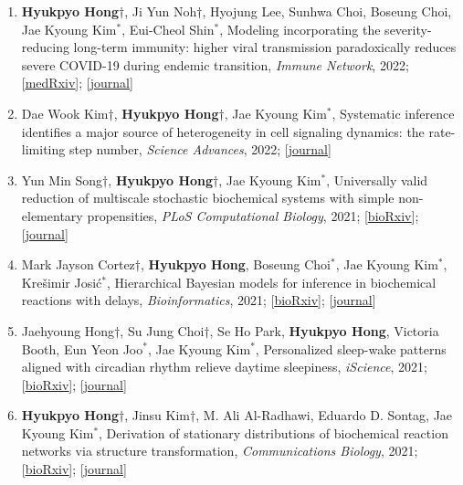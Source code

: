 \documentclass[margin,line]{res}
\begin{document}
\begin{resume}
\begin{enumerate}[leftmargin=*]
    \item \textbf{Hyukpyo Hong}$\dagger$, Ji Yun Noh$\dagger$, Hyojung Lee, Sunhwa Choi, Boseung Choi, Jae Kyoung Kim${}^*$, Eui-Cheol Shin${}^*$, Modeling incorporating the severity-reducing long-term immunity: higher viral transmission paradoxically reduces severe COVID-19 during endemic transition, \textit{Immune Network}, 2022; [\href{https://doi.org/10.1101/2022.02.09.22270633}{\ul{medRxiv}}]; [\href{https://doi.org/10.4110/in.2022.22.e23}{\ul{journal}}]

    \item Dae Wook Kim$\dagger$, \textbf{Hyukpyo Hong}$\dagger$, Jae Kyoung Kim${}^*$, Systematic inference identifies a major source of heterogeneity in cell signaling dynamics: the rate-limiting step number, \textit{Science Advances}, 2022; [\href{https://www.science.org/doi/10.1126/sciadv.abl4598}{\ul{journal}}]

    \item Yun Min Song$\dagger$, \textbf{Hyukpyo Hong}$\dagger$, Jae Kyoung Kim${}^*$, Universally valid reduction of multiscale stochastic biochemical systems with simple non-elementary propensities, \textit{PLoS Computational Biology}, 2021; [\href{https://doi.org/10.1101/2021.04.08.438974}{\ul{bioRxiv}}]; [\href{https://doi.org/10.1371/journal.pcbi.1008952}{\ul{journal}}]

    \item Mark Jayson Cortez$\dagger$, \textbf{Hyukpyo Hong}, Boseung Choi${}^*$, Jae Kyoung Kim${}^*$, Krešimir Josić${}^*$, Hierarchical Bayesian models for inference in biochemical reactions with delays, \textit{Bioinformatics}, 2021; [\href{https://doi.org/10.1101/2021.08.16.456485}{\ul{bioRxiv}}]; [\href{https://doi.org/10.1093/bioinformatics/btab618}{\ul{journal}}]

    \item Jaehyoung Hong$\dagger$, Su Jung Choi$\dagger$, Se Ho Park, \textbf{Hyukpyo Hong}, Victoria Booth, Eun Yeon Joo${}^*$, Jae Kyoung Kim${}^*$, Personalized sleep-wake patterns aligned with circadian rhythm relieve daytime sleepiness, \textit{iScience}, 2021; [\href{https://doi.org/10.1101/2021.03.15.435366}{\ul{bioRxiv}}]; [\href{https://doi.org/10.1016/j.isci.2021.103129}{\ul{journal}}]

    \item \textbf{Hyukpyo Hong}$\dagger$, Jinsu Kim$\dagger$, M. Ali Al-Radhawi, Eduardo D. Sontag, Jae Kyoung Kim${}^*$, Derivation of stationary distributions of biochemical reaction networks via structure transformation, \textit{Communications Biology}, 2021; [\href{https://doi.org/10.1101/2021.03.23.436681}{\ul{bioRxiv}}]; [\href{https://www.nature.com/articles/s42003-021-02117-x}{\ul{journal}}]


\end{enumerate}
\end{resume}
\end{document}
